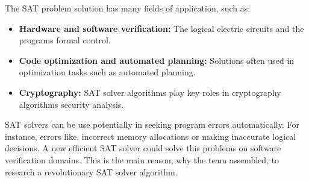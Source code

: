 \documentclass{article}
\begin{document}
The SAT problem solution has many fields of application, such as:
\begin{itemize}
    \item \textbf{Hardware and software verification:} The logical electric circuits and the programs formal control.
    \item \textbf{Code optimization and automated planning:} Solutions often used in optimization tasks such as automated planning.
    \item \textbf{Cryptography:} SAT solver algorithms play key roles in cryptography algorithms security analysis.
\end{itemize}
SAT solvers can be use potentially in seeking program errors automatically. For instance, errors like, incorrect memory allocations or making inaccurate logical decisions. A new efficient SAT solver could solve this problems on software verification domains. This is the main reason, why the team assembled, to research a revolutionary SAT solver algorithm.
\end{document}
